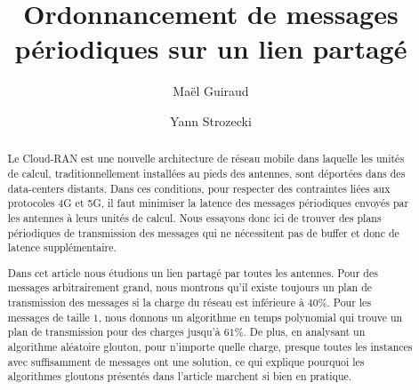 \documentclass[10pt, conference, letterpaper]{algotel}
\author{Maël Guiraud\addressmark{1,2}
  \and Yann Strozecki\addressmark{1}}
\title{Ordonnancement de messages périodiques sur un lien partagé}
\begin{document}
\maketitle

\begin{abstract}
Le Cloud-RAN est une nouvelle architecture de réseau mobile dans laquelle les unités de calcul, traditionnellement installées au pieds des antennes, sont déportées dans des data-centers distants. Dans ces conditions, pour respecter des contraintes liées aux protocoles 4G et 5G, il faut minimiser la latence des messages périodiques envoyés par les antennes
à leurs unités de calcul. Nous essayons donc ici de trouver des plans périodiques de transmission des messages qui ne nécessitent pas de buffer et donc de latence supplémentaire.

Dans cet article nous étudions un lien partagé par toutes les antennes. Pour des messages arbitrairement grand, nous montrons qu'il existe toujours un plan de transmission des messages si la charge du réseau est inférieure à $40\%$.  Pour les messages de taille $1$, nous donnons un algorithme en temps polynomial qui trouve un plan de transmission pour des charges jusqu'à $61\%$. De plus, en analysant un algorithme aléatoire glouton, pour n'importe quelle charge, presque toutes les instances avec suffisamment de messages ont une solution, ce qui explique pourquoi les algorithmes gloutons présentés dans l'article marchent si bien en pratique.
\end{abstract}




\end{document}
